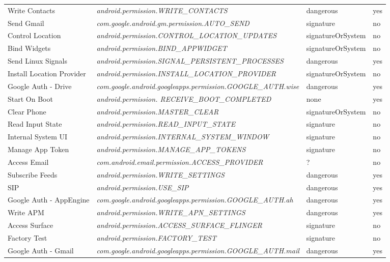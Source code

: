 \begin{small}
\begin{longtable}{p{3cm}|p{8cm}|p{2.5cm}|p{1.5cm}}
Write Contacts & \textit{android.permission.\-WRITE\_CONTACTS} & dangerous & yes \\
Send Gmail & \textit{com.google.android.gm.permission.\-AUTO\_SEND} & signature & no \\
Control Location & \textit{android.permission.\-CONTROL\_LOCATION\_UPDATES} & signatureOrSystem & no \\
Bind Widgets & \textit{android.permission.\-BIND\_APPWIDGET} & signatureOrSystem & no \\
Send Linux Signals & \textit{android.permission.\-SIGNAL\_PERSISTENT\_PROCESSES} & dangerous & yes \\
Install Location Provider & \textit{android.permission.\-INSTALL\_LOCATION\_PROVIDER} & signatureOrSystem & no \\
Google Auth - Drive & \textit{com.google.android.googleapps.permission.\-GOOGLE\_AUTH.wise} & dangerous & yes \\
Start On Boot & \textit{android.permission.\- RECEIVE\_BOOT\_COMPLETED} & none & yes \\
Clear Phone & \textit{android.permission.\-MASTER\_CLEAR} & signatureOrSystem & no \\
Read Input State & \textit{android.permission.\-READ\_INPUT\_STATE} & signature & no \\
Internal System UI & \textit{android.permission.\-INTERNAL\_SYSTEM\_WINDOW} & signature & no \\
Manage App Token & \textit{android.permission.\-MANAGE\_APP\_TOKENS} & signature & no \\
Access Email & \textit{com.android.email.permission.\-ACCESS\_PROVIDER} & ? & no \\
Subscribe Feeds & \textit{android.permission.\-WRITE\_SETTINGS} & dangerous & yes \\
SIP & \textit{android.permission.\-USE\_SIP} & dangerous & yes \\
Google Auth - AppEngine & \textit{com.google.android.googleapps.permission.\-GOOGLE\_AUTH.ah} & dangerous & yes \\
Write APM & \textit{android.permission.\-WRITE\_APN\_SETTINGS} & dangerous & yes \\
Access Surface & \textit{android.permission.\-ACCESS\_SURFACE\_FLINGER} & signature & no \\
Factory Test & \textit{android.permission.\-FACTORY\_TEST} & signature & no \\
Google Auth - Gmail & \textit{com.google.android.googleapps.permission.\-GOOGLE\_AUTH.mail} & dangerous & yes \\

\end{longtable}
\end{small}
